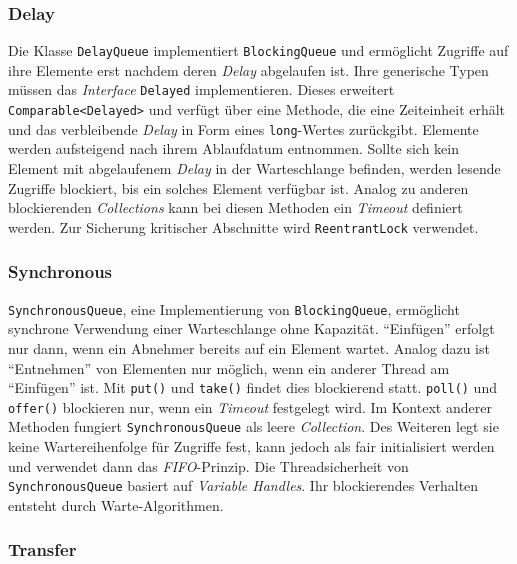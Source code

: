 \documentclass[a4paper, 11pt]{article}
\begin{document}
\subsubsection{Delay}
\label{subsubsec:collections:concepts:delay}

Die Klasse \verb|DelayQueue| implementiert \verb|BlockingQueue| und ermöglicht Zugriffe auf ihre Elemente erst nachdem deren \textit{Delay} abgelaufen ist.
Ihre generische Typen müssen das \textit{Interface} \verb|Delayed| implementieren.
Dieses erweitert \verb|Comparable<Delayed>| und verfügt über eine Methode, die eine Zeiteinheit erhält und das verbleibende \textit{Delay} in Form eines \verb|long|-Wertes zurückgibt.
Elemente werden aufsteigend nach ihrem Ablaufdatum entnommen.
Sollte sich kein Element mit abgelaufenem \textit{Delay} in der Warteschlange befinden, werden lesende Zugriffe blockiert, bis ein solches Element verfügbar ist.
Analog zu anderen blockierenden \textit{Collections} kann bei diesen Methoden ein \textit{Timeout} definiert werden.
Zur Sicherung kritischer Abschnitte wird \verb|ReentrantLock| verwendet.

\subsubsection{Synchronous}
\label{subsubsec:collections:concepts:synchronous}

\verb|SynchronousQueue|, eine Implementierung von \verb|BlockingQueue|, ermöglicht synchrone Verwendung einer Warteschlange ohne Kapazität.
"`Einfügen"' erfolgt nur dann, wenn ein Abnehmer bereits auf ein Element wartet.
Analog dazu ist "`Entnehmen"' von Elementen nur möglich, wenn ein anderer Thread am "`Einfügen"' ist.
Mit \verb|put()| und \verb|take()| findet dies blockierend statt.
\verb|poll()| und \verb|offer()| blockieren nur, wenn ein \textit{Timeout} festgelegt wird.
Im Kontext anderer Methoden fungiert \verb|SynchronousQueue| als leere \textit{Collection}.
Des Weiteren legt sie keine Wartereihenfolge für Zugriffe fest, kann jedoch als fair initialisiert werden und verwendet dann das \textit{FIFO}-Prinzip.
Die Threadsicherheit von \verb|SynchronousQueue| basiert auf \textit{Variable Handles}.
Ihr blockierendes Verhalten entsteht durch Warte-Algorithmen.

\subsubsection{Transfer}
\label{subsubsec:collections:concepts:transfer}
\end{document}
